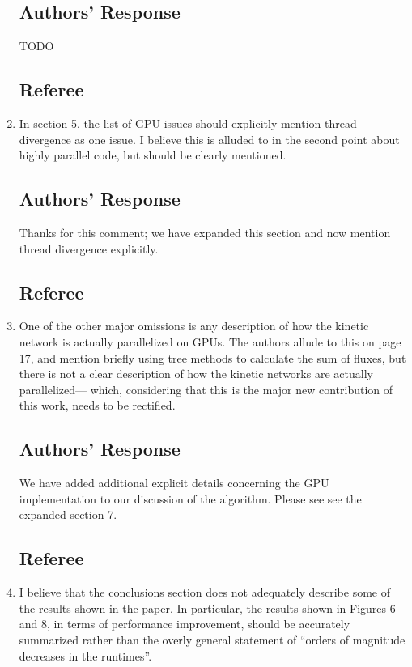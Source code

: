 \documentclass[12pt]{article}
\begin{document}
\begin{enumerate}
\subsection*{Authors' Response}
TODO

\subsection*{Referee}
\item  In section 5, the list of GPU issues should explicitly mention thread divergence
as one issue. I believe this is alluded to in the second point about highly parallel
code, but should be clearly mentioned.

\subsection*{Authors' Response}
Thanks for this comment; we have expanded this section and now mention thread divergence explicitly.

\subsection*{Referee}
\item One of the other major omissions is any description of how the kinetic network
is actually parallelized on GPUs. The authors allude to this on page 17, and
mention briefly using tree methods to calculate the sum of fluxes, but there is
not a clear description of how the kinetic networks are actually parallelized—
which, considering that this is the major new contribution of this work, needs to
be rectified.

\subsection*{Authors' Response}
We have added additional explicit details concerning the GPU implementation to our
discussion of the algorithm.  Please see see the expanded section 7.

\subsection*{Referee}
\item I believe that the conclusions section does not adequately describe some of
the results shown in the paper. In particular, the results shown in Figures 6 and
8, in terms of performance improvement, should be accurately summarized
rather than the overly general statement of ``orders of magnitude decreases in
the runtimes''.


\end{enumerate}
\end{document}
